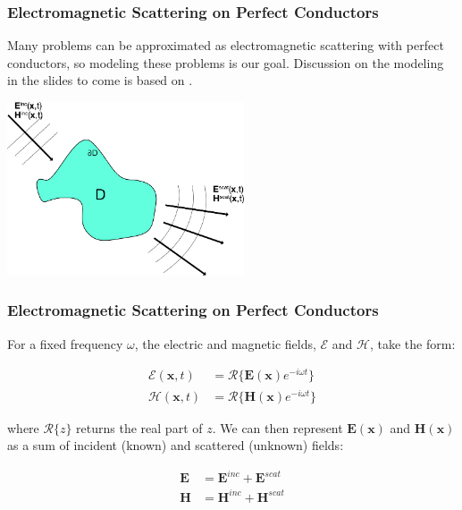 \documentclass{beamer}
\newcommand{\bvec}[1]{\boldsymbol{#1}}
\begin{document}
	\begin{frame}
	\frametitle{Electromagnetic Scattering on Perfect Conductors}
	Many problems can be approximated as electromagnetic scattering with perfect conductors, so modeling these problems is our goal. Discussion on the modeling in the slides to come is based on \cite{dpie}.
	
	\vspace{0.1in}
	\begin{center}
		\includegraphics[width=7cm]{scatter_problem_pic}
	\end{center}
	\end{frame}
	
	\begin{frame}
	\frametitle{Electromagnetic Scattering on Perfect Conductors}
	For a fixed frequency $\omega$, the electric and magnetic fields, $\mathcal{E}$ and $\mathcal{H}$, take the form:
	
	\begin{align*}
	\mathcal{E}(\bvec{x},t) &= \mathcal{R}\lbrace \bvec{E}(\bvec{x}) e^{- i \omega t}\rbrace \\
	\mathcal{H}(\bvec{x},t) &= \mathcal{R}\lbrace \bvec{H}(\bvec{x}) e^{- i \omega t}\rbrace
	\end{align*}
	
	where $\mathcal{R}\lbrace z \rbrace$ returns the real part of $z$. We can then represent $\bvec{E}(\bvec{x})$ and $\bvec{H}(\bvec{x})$ as a sum of incident (known) and scattered (unknown) fields:
	
	\begin{align*}
	\bvec{E} &= \bvec{E}^{inc} + \bvec{E}^{scat} \\
	\bvec{H} &= \bvec{H}^{inc} + \bvec{H}^{scat}
	\end{align*}
	
	\end{frame}
\end{document}

